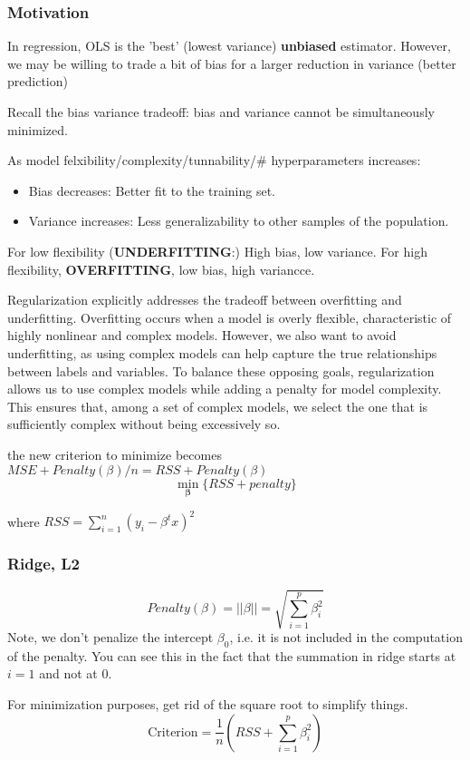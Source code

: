 \documentclass{article}
\begin{document}
\subsubsection{Motivation}
In regression, OLS is the 'best' (lowest variance) \textbf{unbiased} estimator. 
However, we may be willing to trade a bit of bias for a larger reduction in variance (better prediction)

Recall the bias variance tradeoff:  bias and variance cannot be simultaneously minimized.

As model felxibility/complexity/tunnability/\# hyperparameters increases:
\begin{itemize}
\item Bias decreases: Better fit to the training set. 
\item Variance increases: Less generalizability to other samples of the population.
\end{itemize}

For low flexibility (\textbf{UNDERFITTING}:) High bias, low variance. For high flexibility, \textbf{OVERFITTING}, low bias, high variancce. 

Regularization explicitly addresses the tradeoff between overfitting and underfitting. Overfitting occurs when a model is overly flexible, characteristic of highly nonlinear and complex models. However, we also want to avoid underfitting, as using complex models can help capture the true relationships between labels and variables. To balance these opposing goals, regularization allows us to use complex models while adding a penalty for model complexity. This ensures that, among a set of complex models, we select the one that is sufficiently complex without being excessively so.

the new criterion to minimize becomes $MSE + Penalty(\beta)/n = RSS + Penalty(\beta)$
\[ \min_{\bm \beta} \{ RSS + penalty \}\]

where $RSS = \sum_{i=1}^n (y_i- \beta^t x)^2$

\subsubsection{Ridge, L2}

\[ Penalty(\beta) = ||\beta|| = \sqrt{\sum_{i=1}^p \beta_i^2}\]
Note, we don't penalize the intercept $\beta_0$, i.e. it is not included in the computation of the penalty. You can see this in the fact that the summation in ridge starts at $i=1$ and not at 0.

For minimization purposes, get rid of the square root to simplify things. \\
\[ \text{Criterion} = 
\frac{1}{n}
( RSS + \sum_{i=1}^p \beta_i^2 )
\]
\end{document}
